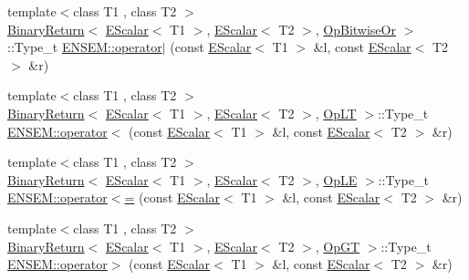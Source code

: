 \begin{DoxyCompactItemize}
\item 
{\footnotesize template$<$class T1 , class T2 $>$ }\\\mbox{\hyperlink{structENSEM_1_1BinaryReturn}{Binary\+Return}}$<$ \mbox{\hyperlink{classENSEM_1_1EScalar}{E\+Scalar}}$<$ T1 $>$, \mbox{\hyperlink{classENSEM_1_1EScalar}{E\+Scalar}}$<$ T2 $>$, \mbox{\hyperlink{structENSEM_1_1OpBitwiseOr}{Op\+Bitwise\+Or}} $>$\+::Type\+\_\+t \mbox{\hyperlink{group__escalar_gadc4bc2eaed30b8d8661741f6ece0de03}{E\+N\+S\+E\+M\+::operator$\vert$}} (const \mbox{\hyperlink{classENSEM_1_1EScalar}{E\+Scalar}}$<$ T1 $>$ \&l, const \mbox{\hyperlink{classENSEM_1_1EScalar}{E\+Scalar}}$<$ T2 $>$ \&r)
\item 
{\footnotesize template$<$class T1 , class T2 $>$ }\\\mbox{\hyperlink{structENSEM_1_1BinaryReturn}{Binary\+Return}}$<$ \mbox{\hyperlink{classENSEM_1_1EScalar}{E\+Scalar}}$<$ T1 $>$, \mbox{\hyperlink{classENSEM_1_1EScalar}{E\+Scalar}}$<$ T2 $>$, \mbox{\hyperlink{structENSEM_1_1OpLT}{Op\+LT}} $>$\+::Type\+\_\+t \mbox{\hyperlink{group__escalar_gad3a307ef5e78a5c23670ded8c75cdde5}{E\+N\+S\+E\+M\+::operator$<$}} (const \mbox{\hyperlink{classENSEM_1_1EScalar}{E\+Scalar}}$<$ T1 $>$ \&l, const \mbox{\hyperlink{classENSEM_1_1EScalar}{E\+Scalar}}$<$ T2 $>$ \&r)
\item 
{\footnotesize template$<$class T1 , class T2 $>$ }\\\mbox{\hyperlink{structENSEM_1_1BinaryReturn}{Binary\+Return}}$<$ \mbox{\hyperlink{classENSEM_1_1EScalar}{E\+Scalar}}$<$ T1 $>$, \mbox{\hyperlink{classENSEM_1_1EScalar}{E\+Scalar}}$<$ T2 $>$, \mbox{\hyperlink{structENSEM_1_1OpLE}{Op\+LE}} $>$\+::Type\+\_\+t \mbox{\hyperlink{group__escalar_gaf6abf7f5f838e38b67549d4af6f8683a}{E\+N\+S\+E\+M\+::operator$<$=}} (const \mbox{\hyperlink{classENSEM_1_1EScalar}{E\+Scalar}}$<$ T1 $>$ \&l, const \mbox{\hyperlink{classENSEM_1_1EScalar}{E\+Scalar}}$<$ T2 $>$ \&r)
\item 
{\footnotesize template$<$class T1 , class T2 $>$ }\\\mbox{\hyperlink{structENSEM_1_1BinaryReturn}{Binary\+Return}}$<$ \mbox{\hyperlink{classENSEM_1_1EScalar}{E\+Scalar}}$<$ T1 $>$, \mbox{\hyperlink{classENSEM_1_1EScalar}{E\+Scalar}}$<$ T2 $>$, \mbox{\hyperlink{structENSEM_1_1OpGT}{Op\+GT}} $>$\+::Type\+\_\+t \mbox{\hyperlink{group__escalar_ga92b83acdab0e4e35ee7687740b1d3a01}{E\+N\+S\+E\+M\+::operator$>$}} (const \mbox{\hyperlink{classENSEM_1_1EScalar}{E\+Scalar}}$<$ T1 $>$ \&l, const \mbox{\hyperlink{classENSEM_1_1EScalar}{E\+Scalar}}$<$ T2 $>$ \&r)
\item 

\end{DoxyCompactItemize}
